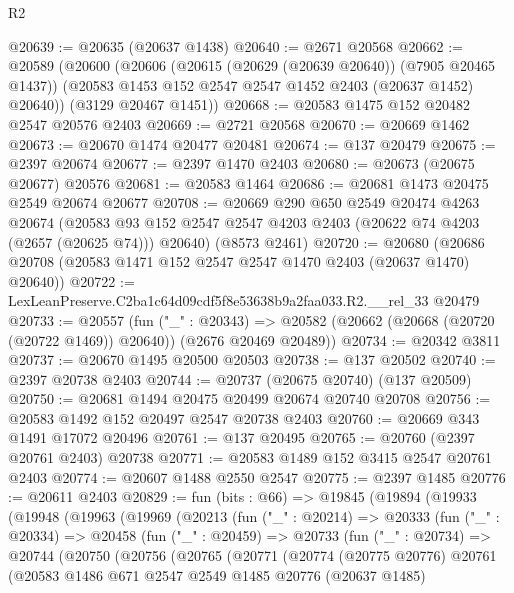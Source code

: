 \begin{lexlean}{R2}
\begin{coremodule}
@20639 := @20635 (@20637 @1438)
@20640 := @2671 @20568
@20662 := @20589
    (@20600
      (@20606
        (@20615 (@20629 (@20639 @20640)) (@7905 @20465 @1437))
        (@20583 @1453 @152 @2547 @2547 @1452 @2403 (@20637 @1452) @20640))
      (@3129 @20467 @1451))
@20668 := @20583 @1475 @152 @20482 @2547 @20576 @2403
@20669 := @2721 @20568
@20670 := @20669 @1462
@20673 := @20670 @1474 @20477 @20481
@20674 := @137 @20479
@20675 := @2397 @20674
@20677 := @2397 @1470 @2403
@20680 := @20673 (@20675 @20677) @20576
@20681 := @20583 @1464
@20686 := @20681 @1473 @20475 @2549 @20674 @20677
@20708 := @20669
    @290
    @650
    @2549
    @20474
    @4263
    @20674
    (@20583 @93 @152 @2547 @2547 @4203 @2403 (@20622 @74 @4203 (@2657 (@20625 @74))) @20640)
    (@8573 @2461)
@20720 := @20680 (@20686 @20708 (@20583 @1471 @152 @2547 @2547 @1470 @2403 (@20637 @1470) @20640))
@20722 := LexLeanPreserve.C2ba1c64d09cdf5f8e53638b9a2faa033.R2.__rel_33 @20479
@20733 := @20557
    (fun ("_" : @20343) =>
    @20582 (@20662 (@20668 (@20720 (@20722 @1469)) @20640)) (@2676 @20469 @20489))
@20734 := @20342 @3811
@20737 := @20670 @1495 @20500 @20503
@20738 := @137 @20502
@20740 := @2397 @20738 @2403
@20744 := @20737 (@20675 @20740) (@137 @20509)
@20750 := @20681 @1494 @20475 @20499 @20674 @20740 @20708
@20756 := @20583 @1492 @152 @20497 @2547 @20738 @2403
@20760 := @20669 @343 @1491 @17072 @20496
@20761 := @137 @20495
@20765 := @20760 (@2397 @20761 @2403) @20738
@20771 := @20583 @1489 @152 @3415 @2547 @20761 @2403
@20774 := @20607 @1488 @2550 @2547
@20775 := @2397 @1485
@20776 := @20611 @2403
@20829 := fun (bits : @66) =>
  @19845
    (@19894
      (@19933
        (@19948
          (@19963
            (@19969
              (@20213
                (fun ("_" : @20214) =>
                @20333
                  (fun ("_" : @20334) =>
                  @20458
                    (fun ("_" : @20459) =>
                    @20733
                      (fun ("_" : @20734) =>
                      @20744
                        (@20750
                          (@20756
                            (@20765
                              (@20771
                                (@20774
                                  (@20775 @20776)
                                  @20761
                                  (@20583
                                    @1486
                                    @671
                                    @2547
                                    @2549
                                    @1485
                                    @20776
                                    (@20637 @1485)

\end{coremodule}
\end{lexlean}
